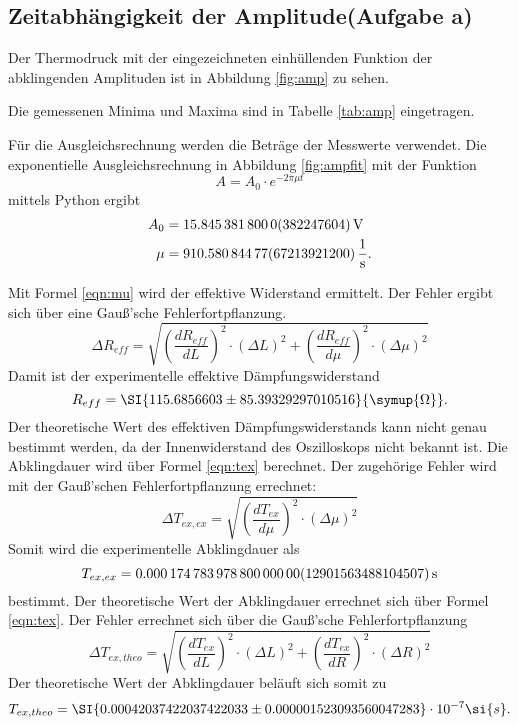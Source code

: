 \subsection{Zeitabhängigkeit der Amplitude(Aufgabe a)}
Der Thermodruck mit der eingezeichneten einhüllenden Funktion der abklingenden Amplituden ist in Abbildung \ref{fig:amp} zu sehen.

Die gemessenen Minima und Maxima sind in Tabelle \ref{tab:amp} eingetragen.

Für die Ausgleichsrechnung werden die Beträge der Messwerte verwendet.
Die exponentielle Ausgleichsrechnung in Abbildung \ref{fig:ampfit} mit der Funktion
\begin{equation*}
  A=A_{0} \cdot e^{-2 \pi \mu t}
\end{equation*}
mittels Python ergibt
\begin{align*}
  A_{0} &= \SI{15.8453818 \pm 0.0382247604}{V} \\
  \mu &= \SI{910.58084477 \pm 672.139212}{\frac{1}{s}}.
\end{align*}

Mit Formel \eqref{eqn:mu} wird der effektive Widerstand ermittelt.
Der Fehler ergibt sich über eine Gauß'sche Fehlerfortpflanzung.
\begin{equation*}
  \Delta R_{eff} = \sqrt{ \left( \frac{d R_{eff}}{dL} \right)^2 \cdot (\Delta L)^2 + \left( \frac{d R_{eff}}{d \mu} \right)^2 \cdot (\Delta \mu)^2 }
\end{equation*}
Damit ist der experimentelle effektive Dämpfungswiderstand
\begin{equation*}
  R_{eff}= \SI{115.6856603 \pm 85.39329297010516}{\symup{\Omega}}.
\end{equation*}
Der theoretische Wert des effektiven Dämpfungswiderstands kann nicht genau bestimmt werden, da der Innenwiderstand des Oszilloskops nicht bekannt ist.
Die Abklingdauer wird über Formel \eqref{eqn:tex} berechnet.
Der zugehörige Fehler wird mit der Gauß'schen Fehlerfortpflanzung errechnet:
\begin{equation*}
  \Delta T_{ex, ex} = \sqrt{ \left( \frac{d T_{ex}}{d \mu} \right)^2 \cdot (\Delta \mu)^2 }
\end{equation*}
Somit wird die experimentelle Abklingdauer als
\begin{equation*}
  T_{ex, ex}= \SI{0.0001747839788 \pm 0.00012901563488104507}{s}
\end{equation*}
bestimmt.
Der theoretische Wert der Abklingdauer errechnet sich über Formel \eqref{eqn:tex}.
Der Fehler errechnet sich über die Gauß'sche Fehlerfortpflanzung
\begin{equation*}
  \Delta T_{ex, theo}= \sqrt{ \left( \frac{d T_{ex}}{dL} \right)^2 \cdot (\Delta L)^2 + \left( \frac{d T_{ex}}{dR} \right)^2 \cdot (\Delta R)^2}
\end{equation*}
Der theoretische Wert der Abklingdauer beläuft sich somit zu
\begin{equation*}
  T_{ex, theo}= \SI{0.00042037422037422033 \pm 0.000001523093560047283} \cdot 10^{-7} \si{s}.
\end{equation*}